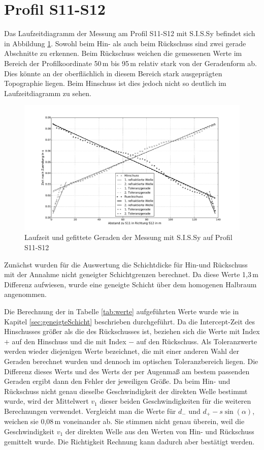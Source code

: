 \section{Profil S11-S12}

Das Laufzeitdiagramm der Messung am Profil S11-S12 mit S.I.S.Sy befindet sich in Abbildung \ref{fig:plotsissy}. Sowohl beim Hin- als auch beim Rückschuss sind zwei gerade Abschnitte zu erkennen. Beim Rückschuss weichen die gemessenen Werte im Bereich der Profilkoordinate 50\,m bis 95\,m relativ stark von der Geradenform ab. Dies könnte an der oberflächlich in diesem Bereich stark ausgeprägten Topographie liegen. Beim Hinschuss ist dies jedoch nicht so deutlich im Laufzeitdiagramm zu sehen.

\begin{figure}[!ht]
 \centering
 \includegraphics[width=\textwidth]{fig/plotsissy}
 \caption{Laufzeit und gefittete Geraden der Messung mit S.I.S.Sy auf Profil S11-S12}
 \label{fig:plotsissy}
\end{figure}

Zunächst wurden für die Auswertung die Schichtdicke für Hin-und Rückschuss mit der Annahme nicht geneigter Schichtgrenzen berechnet. Da diese Werte 1,3\,m Differenz aufwiesen, wurde eine geneigte Schicht über dem homogenen Halbraum angenommen.

Die Berechnung der in Tabelle \ref{tab:werte} aufgeführten Werte wurde wie in Kapitel \ref{sec:geneigteSchicht} beschrieben durchgeführt. Da die Intercept-Zeit des Hinschusses größer als die des Rückschusses ist, beziehen sich die Werte mit Index $+$ auf den Hinschuss und die mit Index $-$ auf den Rückschuss. Als Toleranzwerte werden wieder diejenigen Werte bezeichnet, die mit einer anderen Wahl der Geraden berechnet wurden und dennoch im optischen Toleranzbereich liegen. Die Differenz dieses Werts und des Werts der per Augenmaß am bestem passenden Geraden ergibt dann den Fehler der jeweiligen Größe. Da beim Hin- und Rückschuss nicht genau dieselbe Geschwindigkeit der direkten Welle bestimmt wurde, wird der Mittelwert $v_1$ dieser beiden Geschwindigkeiten für die weiteren Berechnungen verwendet. Vergleicht man die Werte für $d_-$ und $d_+-s\sin(\alpha)$, weichen sie 0,08\,m voneinander ab. Sie stimmen nicht genau überein, weil die Geschwindigkeit $v_1$ der direkten Welle aus den Werten von Hin- und Rückschuss gemittelt wurde. Die Richtigkeit Rechnung kann dadurch aber bestätigt werden.

